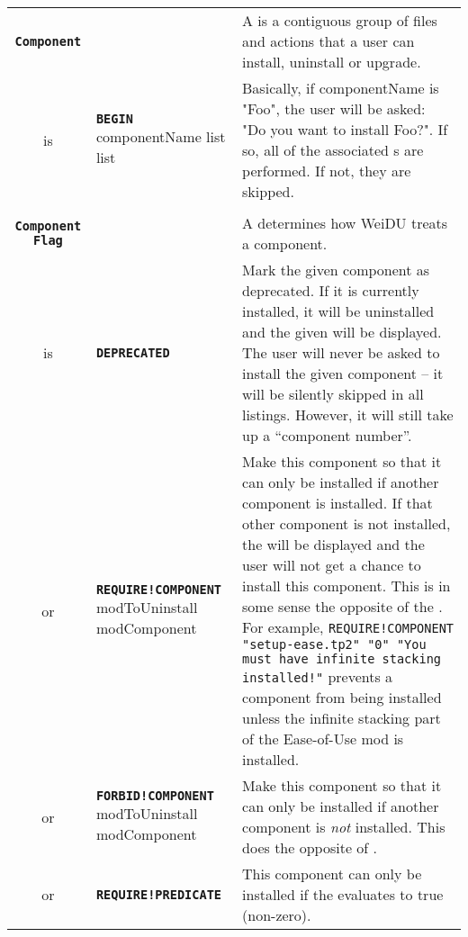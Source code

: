 \documentclass{article}
\def\ttref#1{\ahrefloc{#1}{\tt #1}}
\def\DEFINE#1{{\tt \bf #1}\label{#1}\index{#1}}
\def\DEFSYN#1{{\tt \bf #1}\index{#1}}
\def\t#1{{\tt #1}}
\def\Slist{{\color{red} list }}
\begin{document}
\begin{tabular}{cp{10in}|p{10in}}
\DEFINE{Component} & &
  A \ttref{Component} is a contiguous group of files and actions that a
  user can install, uninstall or upgrade. \\

  is & \DEFSYN{BEGIN} componentName 
    \ttref{Component Flag} \Slist 
    \ttref{TP2 Action} \Slist &
    Basically, if componentName is "Foo", the user will be asked: "Do you
    want to install Foo?". If so, all of the associated \ttref{TP2 Action}s 
    are performed. If not, they are skipped. \\

\\

\DEFINE{Component Flag} && 
  A \ttref{Component Flag} determines how WeiDU treats a component. \\

  is & \DEFINE{DEPRECATED} \ttref{String} & 
      Mark the given component as deprecated. If it is currently installed,
      it will be uninstalled and the given \ttref{String} will be
      displayed. The user will never be asked to install the given
      component -- it will be silently skipped in all listings. However, it
      will still take up a ``component number''. \\

  or & \DEFINE{REQUIRE!COMPONENT} modToUninstall modComponent
      \ttref{String} &
      Make this component so that it can only be installed if another
      component is installed. If that other component is not installed, the
      \ttref{String} will be displayed and the user will not get a chance
      to install this component. This is in some sense the opposite of the
      \ttref{UNINSTALL} \ttref{TP2 Action}. For example,
      \t{REQUIRE!COMPONENT "setup-ease.tp2" "0" "You must have infinite
      stacking installed!"} prevents a component from being installed
      unless the infinite stacking part of the Ease-of-Use mod is
      installed.  \\

  or & \DEFINE{FORBID!COMPONENT} modToUninstall modComponent
      \ttref{String} &
      Make this component so that it can only be installed if another
      component is \emph{not} installed. This does the opposite of
      \ttref{REQUIRE!COMPONENT}.  \\

  or & \DEFINE{REQUIRE!PREDICATE} \ttref{value} \ttref{String} &
      This component can only be installed if the \ttref{value}
      evaluates to true (non-zero). \\


\end{tabular}
\end{document}
